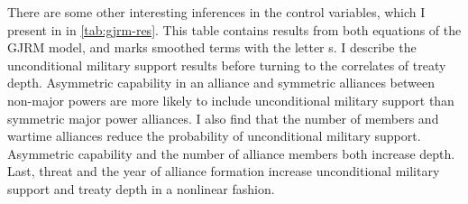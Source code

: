 \documentclass[12pt]{article}
\begin{document}
There are some other interesting inferences in the control variables, which I present in in \autoref{tab:gjrm-res}. 
This table contains results from both equations of the GJRM model, and marks smoothed terms with the letter s. 
I describe the unconditional military support results before turning to the correlates of treaty depth. 
Asymmetric capability in an alliance and symmetric alliances between non-major powers are more likely to include unconditional military support than symmetric major power alliances. 
I also find that the number of members and wartime alliances reduce the probability of unconditional military support. 
Asymmetric capability and the number of alliance members both increase depth. 
Last, threat and the year of alliance formation increase unconditional military support and treaty depth in a nonlinear fashion. 
\end{document}
